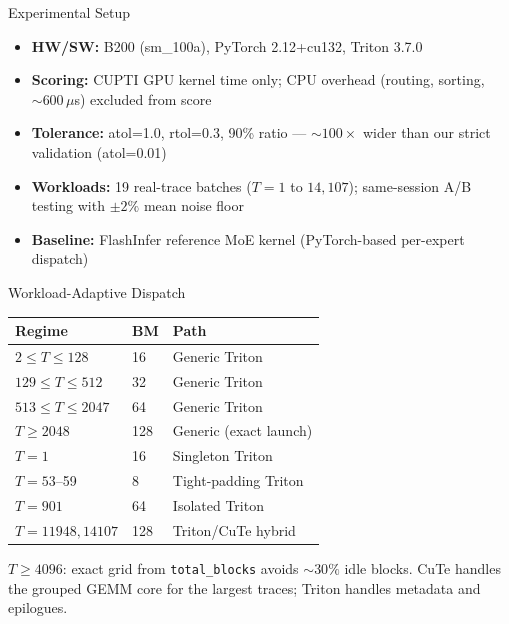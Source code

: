 \documentclass[final,t]{beamer}
\newlength{\colsep}
\newlength{\colheight}
\begin{document}
\begin{frame}[t]
\begin{minipage}[t]{0.225\textwidth}
\begin{minipage}[t][\colheight][t]{\textwidth}
\begin{block}{Experimental Setup}
\begin{itemize}
\item \textbf{HW/SW:} B200 (sm\_100a), PyTorch 2.12+cu132, Triton 3.7.0
\item \textbf{Scoring:} CUPTI GPU kernel time only; CPU overhead (routing, sorting, ${\sim}600\,\mu$s) excluded from score
\item \textbf{Tolerance:} atol=1.0, rtol=0.3, 90\% ratio --- ${\sim}100\times$ wider than our strict validation (atol=0.01)
\item \textbf{Workloads:} 19 real-trace batches ($T{=}1$ to $14{,}107$); same-session A/B testing with ${\pm}2\%$ mean noise floor
\item \textbf{Baseline:} FlashInfer reference MoE kernel (PyTorch-based per-expert dispatch)
\end{itemize}
\end{block}

\begin{block}{Workload-Adaptive Dispatch}
\small
\begin{tabular}{@{}lll@{}}
\toprule
\textbf{Regime} & \textbf{BM} & \textbf{Path} \\
\midrule
$2 \le T \le 128$ & 16 & Generic Triton \\
$129 \le T \le 512$ & 32 & Generic Triton \\
$513 \le T \le 2047$ & 64 & Generic Triton \\
$T \ge 2048$ & 128 & Generic (exact launch) \\
\midrule
$T{=}1$ & 16 & Singleton Triton \\
$T{=}53$--59 & 8 & Tight-padding Triton \\
$T{=}901$ & 64 & Isolated Triton \\
$T{=}11948,14107$ & 128 & Triton/CuTe hybrid \\
\bottomrule
\end{tabular}
\normalsize
\vspace{4pt}

$T{\ge}4096$: exact grid from \texttt{total\_blocks} avoids ${\sim}30\%$ idle blocks. CuTe handles the grouped GEMM core for the largest traces; Triton handles metadata and epilogues.
\end{block}

\end{minipage}
\end{minipage}%
\hspace{\colsep}%
\begin{minipage}[t]{0.245\textwidth}
\begin{minipage}[t][\colheight][t]{\textwidth}


\end{minipage}
\end{minipage}
\end{frame}
\end{document}
